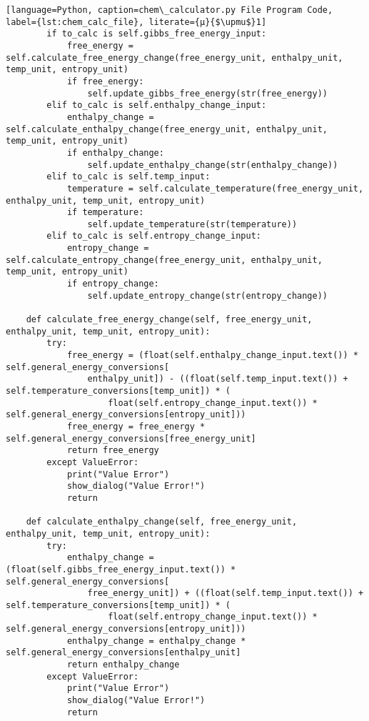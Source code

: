 \begin{lstlisting}[language=Python, caption=chem\_calculator.py File Program Code, label={lst:chem_calc_file}, literate={μ}{$\upmu$}1]
        if to_calc is self.gibbs_free_energy_input:
            free_energy = self.calculate_free_energy_change(free_energy_unit, enthalpy_unit, temp_unit, entropy_unit)
            if free_energy:
                self.update_gibbs_free_energy(str(free_energy))
        elif to_calc is self.enthalpy_change_input:
            enthalpy_change = self.calculate_enthalpy_change(free_energy_unit, enthalpy_unit, temp_unit, entropy_unit)
            if enthalpy_change:
                self.update_enthalpy_change(str(enthalpy_change))
        elif to_calc is self.temp_input:
            temperature = self.calculate_temperature(free_energy_unit, enthalpy_unit, temp_unit, entropy_unit)
            if temperature:
                self.update_temperature(str(temperature))
        elif to_calc is self.entropy_change_input:
            entropy_change = self.calculate_entropy_change(free_energy_unit, enthalpy_unit, temp_unit, entropy_unit)
            if entropy_change:
                self.update_entropy_change(str(entropy_change))

    def calculate_free_energy_change(self, free_energy_unit, enthalpy_unit, temp_unit, entropy_unit):
        try:
            free_energy = (float(self.enthalpy_change_input.text()) * self.general_energy_conversions[
                enthalpy_unit]) - ((float(self.temp_input.text()) + self.temperature_conversions[temp_unit]) * (
                    float(self.entropy_change_input.text()) * self.general_energy_conversions[entropy_unit]))
            free_energy = free_energy * self.general_energy_conversions[free_energy_unit]
            return free_energy
        except ValueError:
            print("Value Error")
            show_dialog("Value Error!")
            return

    def calculate_enthalpy_change(self, free_energy_unit, enthalpy_unit, temp_unit, entropy_unit):
        try:
            enthalpy_change = (float(self.gibbs_free_energy_input.text()) * self.general_energy_conversions[
                free_energy_unit]) + ((float(self.temp_input.text()) + self.temperature_conversions[temp_unit]) * (
                    float(self.entropy_change_input.text()) * self.general_energy_conversions[entropy_unit]))
            enthalpy_change = enthalpy_change * self.general_energy_conversions[enthalpy_unit]
            return enthalpy_change
        except ValueError:
            print("Value Error")
            show_dialog("Value Error!")
            return


\end{lstlisting}
